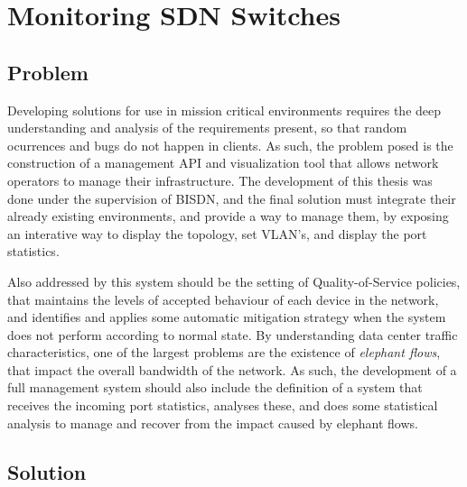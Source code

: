 \chapter{Monitoring SDN Switches} \label{chap:mon_sdn} %

\section {Problem}

Developing solutions for use in mission critical environments requires the deep understanding and analysis of the requirements present, so that random ocurrences and bugs do not happen in clients. As such, the problem posed is 
the construction of a management API and visualization tool that allows network operators to manage their infrastructure. The development of this thesis was done under the supervision of BISDN, and the final solution must 
integrate their already existing environments, and provide a way to manage them, by exposing an interative way to display the topology, set VLAN's, and display the port statistics. 

\par Also addressed by this system should be the setting of Quality-of-Service policies, that maintains the levels of accepted behaviour of each device in the network, and identifies and applies some automatic mitigation
strategy when the system does not perform according to normal state. By understanding data center traffic characteristics, one of the largest problems are the existence of \textit{elephant flows}, that impact the
overall bandwidth of the network. As such, the development of a full management system should also include the definition of a system that receives the incoming port statistics, analyses these, and does some statistical analysis to
manage and recover from the impact caused by elephant flows.

\section {Solution}
